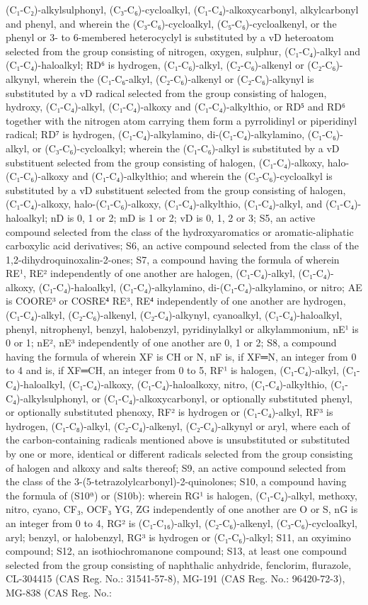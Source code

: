 \documentclass[11pt,a4paper]{article}
\begin{document}
(C₁-C₂)-alkylsulphonyl, (C₃-C₆)-cycloalkyl, (C₁-C₄)-alkoxycarbonyl, alkylcarbonyl and phenyl, and wherein the (C₃-C₆)-cycloalkyl, (C₅-C₆)-cycloalkenyl, or the phenyl or 3- to 6-membered heterocyclyl is substituted by a vD heteroatom selected from the group consisting of nitrogen, oxygen, sulphur, (C₁-C₄)-alkyl and (C₁-C₄)-haloalkyl; RD⁶ is hydrogen, (C₁-C₆)-alkyl, (C₂-C₆)-alkenyl or (C₂-C₆)-alkynyl, wherein the (C₁-C₆-alkyl, (C₂-C₆)-alkenyl or (C₂-C₆)-alkynyl is substituted by a vD radical selected from the group consisting of halogen, hydroxy, (C₁-C₄)-alkyl, (C₁-C₄)-alkoxy and (C₁-C₄)-alkylthio, or RD⁵ and RD⁶ together with the nitrogen atom carrying them form a pyrrolidinyl or piperidinyl radical; RD⁷ is hydrogen, (C₁-C₄)-alkylamino, di-(C₁-C₄)-alkylamino, (C₁-C₆)-alkyl, or (C₃-C₆)-cycloalkyl; wherein the (C₁-C₆)-alkyl is substituted by a vD substituent selected from the group consisting of halogen, (C₁-C₄)-alkoxy, halo-(C₁-C₆)-alkoxy and (C₁-C₄)-alkylthio; and wherein the (C₃-C₆)-cycloalkyl is substituted by a vD substituent selected from the group consisting of halogen, (C₁-C₄)-alkoxy, halo-(C₁-C₆)-alkoxy, (C₁-C₄)-alkylthio, (C₁-C₄)-alkyl, and (C₁-C₄)-haloalkyl; nD is 0, 1 or 2; mD is 1 or 2; vD is 0, 1, 2 or 3; S5, an active compound selected from the class of the hydroxyaromatics or aromatic-aliphatic carboxylic acid derivatives; S6, an active compound selected from the class of the 1,2-dihydroquinoxalin-2-ones; S7, a compound having the formula of wherein RE¹, RE² independently of one another are halogen, (C₁-C₄)-alkyl, (C₁-C₄)-alkoxy, (C₁-C₄)-haloalkyl, (C₁-C₄)-alkylamino, di-(C₁-C₄)-alkylamino, or nitro; AE is COORE³ or COSRE⁴ RE³, RE⁴ independently of one another are hydrogen, (C₁-C₄)-alkyl, (C₂-C₆)-alkenyl, (C₂-C₄)-alkynyl, cyanoalkyl, (C₁-C₄)-haloalkyl, phenyl, nitrophenyl, benzyl, halobenzyl, pyridinylalkyl or alkylammonium, nE¹ is 0 or 1; nE², nE³ independently of one another are 0, 1 or 2; S8, a compound having the formula of wherein XF is CH or N, nF is, if XF═N, an integer from 0 to 4 and is, if XF═CH, an integer from 0 to 5, RF¹ is halogen, (C₁-C₄)-alkyl, (C₁-C₄)-haloalkyl, (C₁-C₄)-alkoxy, (C₁-C₄)-haloalkoxy, nitro, (C₁-C₄)-alkylthio, (C₁-C₄)-alkylsulphonyl, or (C₁-C₄)-alkoxycarbonyl, or optionally substituted phenyl, or optionally substituted phenoxy, RF² is hydrogen or (C₁-C₄)-alkyl, RF³ is hydrogen, (C₁-C₈)-alkyl, (C₂-C₄)-alkenyl, (C₂-C₄)-alkynyl or aryl, where each of the carbon-containing radicals mentioned above is unsubstituted or substituted by one or more, identical or different radicals selected from the group consisting of halogen and alkoxy and salts thereof; S9, an active compound selected from the class of the 3-(5-tetrazolylcarbonyl)-2-quinolones; S10, a compound having the formula of (S10ª) or (S10b): wherein RG¹ is halogen, (C₁-C₄)-alkyl, methoxy, nitro, cyano, CF₃, OCF₃ YG, ZG independently of one another are O or S, nG is an integer from 0 to 4, RG² is (C₁-C₁₆)-alkyl, (C₂-C₆)-alkenyl, (C₃-C₆)-cycloalkyl, aryl; benzyl, or halobenzyl, RG³ is hydrogen or (C₁-C₆)-alkyl; S11, an oxyimino compound; S12, an isothiochromanone compound; S13, at least one compound selected from the group consisting of naphthalic anhydride, fenclorim, flurazole, CL-304415 (CAS Reg. No.: 31541-57-8), MG-191 (CAS Reg. No.: 96420-72-3), MG-838 (CAS Reg. No.: 
\end{document}
